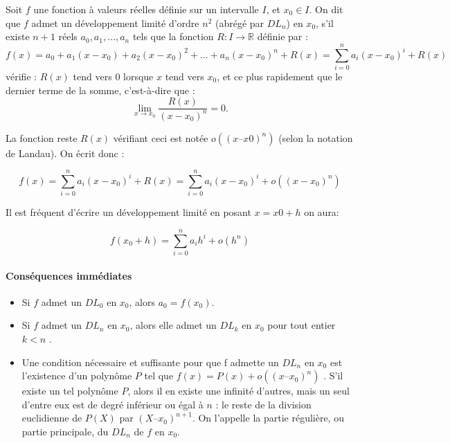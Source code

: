 		Soit $f$ une fonction à valeurs réelles définie sur un intervalle $I$, et $x_0 \in I$. On dit que $f$ admet un développement limité d'ordre $n^2$ (abrégé par $DL_n$) en $x_0$, s'il existe $n + 1$ réels $a_0, a_1, \dots, a_n$  tels que la fonction ${\displaystyle R:I\to \mathbb {R} }$ définie par :
		$${\displaystyle f(x)=a_{0}+a_{1}(x-x_{0})+a_{2}(x-x_{0})^{2}+\dots+a_{n}(x-x_{0})^{n}+R(x)=\sum _{i=0}^{n}a_{i}(x-x_{0})^{i}+R(x)}$$
		vérifie : $R(x)$ tend vers $0$ lorsque $x$ tend vers $x_0$, et ce plus rapidement que le dernier terme de la somme, c'est-à-dire que :
		$$
			\lim _{{x\rightarrow x_{0}}}{\frac{R(x)}{(x-x_{0})^{n}}}=0. 
		$$
		
		La fonction reste $R(x)$ vérifiant ceci est notée $o((x – x0)^n)$ (selon la notation de Landau). On écrit donc :
		
		$$
			f(x)= \sum _{i=0}^{n}a_{i}(x-x_{0})^{i}+R(x) =\sum _{{i=0}}^{n}a_{i}(x-x_{0})^{i}+o((x-x_{0})^{n})
		$$
		
		
		Il est fréquent d'écrire un développement limité en posant $x = x0 + h$ on aura:
		
		
		$$
			f(x_{0}+h)=\sum _{{i=0}}^{n}a_{i}h^{i}+o(h^{n})
		$$
		
		\paragraph*{Conséquences immédiates}
		\begin{itemize}
			\item Si $f$ admet un $DL_0$ en $x_0$, alors $a_0 = f(x_0)$. \cite{coulombeau2013math}
			\item Si $f$ admet un $DL_n$ en $x_0$, alors elle admet un $DL_k$ en $x_0$ pour tout entier $k < n$ \cite{coulombeau2013math}.
			\item Une condition nécessaire et suffisante pour que f admette un $DL_n$ en $x_0$ est l'existence d'un polynôme $P$ tel que $f(x) = P(x) + o((x – x_0)^n)$ \cite{coulombeau2013math}. S'il existe un tel polynôme $P$, alors il en existe une infinité d'autres, mais un seul d'entre eux est de degré inférieur ou égal à $n$ : le reste de la division euclidienne de $P(X)$ par $(X – x_0)^{n+1}$. On l'appelle la partie régulière, ou partie principale, du $DL_n$ de $f$ en $x_0$. %
		\end{itemize}
		
